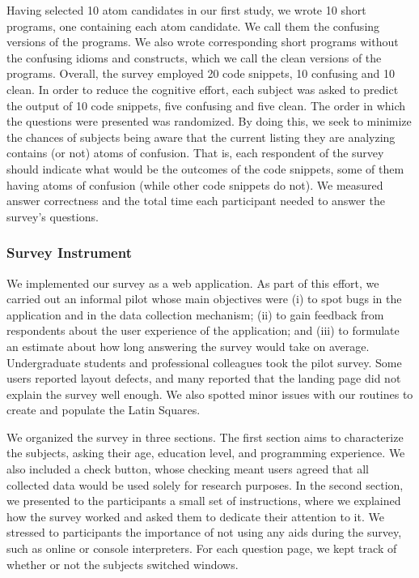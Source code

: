 Having selected 10 atom candidates in our first study, we wrote 10 short programs, one containing each atom candidate. We call them the confusing versions of the programs. We also wrote corresponding short programs without the confusing idioms and constructs, which we call the clean versions of the programs. Overall, the survey employed 20 code snippets, 10 confusing and 10 clean. In order to reduce the cognitive effort, each subject was asked to predict the output of 10 code snippets, five confusing and five clean. The order in which the questions were presented was randomized. By doing this, we seek to minimize the chances of subjects being aware that the current listing they are analyzing contains (or not) atoms of confusion. That is, each respondent of the survey should indicate what would be the outcomes of the code snippets, some of them having atoms of confusion (while other code snippets do not).  We measured answer correctness and the total time each participant needed to answer the survey's questions.

\subsubsection*{Survey Instrument} 

We implemented our survey as a web application. As part of this effort, we carried out an informal pilot whose main objectives were (i) to spot bugs in the application and in the data collection mechanism; (ii) to gain feedback from respondents about the user experience of the application; and (iii) to formulate an estimate about how long answering the survey would take on average. Undergraduate students and professional colleagues took the pilot survey. Some users reported layout defects, and many reported that the landing page did not explain the survey well enough. We also spotted minor issues with our routines to create and populate the Latin Squares. 

We organized the survey in three sections. The first section aims to characterize the subjects, asking their age, education level, and programming experience. We also included a check button, whose checking meant users agreed that all collected data would be used solely for research purposes. In the second section, we presented to the participants a small set of instructions, where we explained how the survey worked and asked them to dedicate their attention to it. We stressed to participants the importance of not using any aids during the survey, such as online or console interpreters. For each question page, we kept track of whether or not the subjects switched windows. 

